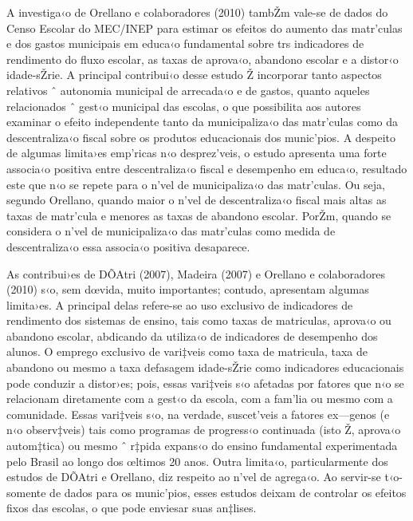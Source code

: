 \documentclass[a4paper, 12pt]{article}
\begin{document}
A investiga‹o de Orellano e colaboradores (2010) tambŽm vale-se de dados do Censo Escolar do MEC/INEP para estimar os efeitos do aumento das matr’culas e dos gastos municipais em educa‹o fundamental sobre  trs indicadores de rendimento do fluxo escolar, as taxas de aprova‹o, abandono escolar e a distor‹o idade-sŽrie. A principal contribui‹o desse estudo Ž incorporar tanto aspectos relativos ˆ autonomia municipal de arrecada‹o e de gastos, quanto aqueles relacionados ˆ gest‹o municipal das escolas, o que possibilita aos autores examinar o efeito independente tanto da municipaliza‹o das matr’culas como da descentraliza‹o fiscal sobre os produtos educacionais dos munic’pios. A despeito de algumas limita›es emp’ricas n‹o desprez’veis, o estudo apresenta uma forte associa‹o positiva entre descentraliza‹o fiscal e desempenho em educa‹o, resultado este que n‹o se repete para o n’vel de municipaliza‹o das matr’culas. Ou seja, segundo Orellano, quando maior o n’vel de descentraliza‹o fiscal mais altas as taxas de matr’cula e menores as taxas de abandono escolar. PorŽm, quando se considera o n’vel de municipaliza‹o das matr’culas como medida de descentraliza‹o essa associa‹o positiva desaparece. 

As contribui›es de DÕAtri (2007), Madeira (2007) e Orellano e colaboradores (2010) s‹o, sem dœvida, muito importantes; contudo, apresentam algumas limita›es. A principal delas refere-se ao uso exclusivo de indicadores de rendimento dos sistemas de ensino, tais como taxas de matriculas, aprova‹o ou abandono escolar, abdicando da utiliza‹o de indicadores de desempenho dos alunos. O emprego exclusivo de vari‡veis como taxa de matricula, taxa de abandono ou mesmo a taxa defasagem idade-sŽrie como indicadores educacionais pode conduzir a distor›es; pois, essas vari‡veis s‹o afetadas por fatores que n‹o se relacionam diretamente com a gest‹o da escola, com a fam’lia ou mesmo com a comunidade. Essas vari‡veis s‹o, na verdade, suscet’veis a fatores ex—genos (e n‹o observ‡veis) tais como programas de progress‹o continuada (isto Ž, aprova‹o autom‡tica) ou mesmo ˆ r‡pida expans‹o do ensino fundamental experimentada pelo Brasil ao longo dos œltimos 20 anos. Outra limita‹o, particularmente dos estudos de DÕAtri e Orellano, diz respeito ao n’vel de agrega‹o. Ao servir-se t‹o-somente de dados para os munic’pios, esses estudos deixam de controlar os efeitos fixos das escolas, o que pode enviesar suas an‡lises.
\end{document}
